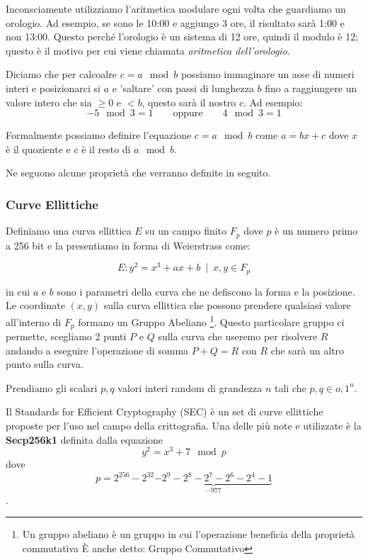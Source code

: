 \documentclass[12pt,a4paper]{article}
\begin{document}
Inconsciamente utilizziamo l'aritmetica modulare ogni volta che guardiamo un
orologio. Ad esempio, se sono le 10:00 e aggiungo 3 ore, il risultato sarà 1:00
e non 13:00. Questo perché l'orologio è un sistema di 12 ore, quindi il modulo è
12; questo è il motivo per cui viene chiamata \textit{aritmetica dell'orologio}.

Diciamo che per calcoalre $ c = a \mod{b} $ possiamo immaginare un asse di
numeri interi e posizionarci si $ a $ e 'saltare' con passi di lunghezza $ b $
fino a raggiungere un valore intero che sia $ \ge 0 $ e $ < b $, questo sarà il
nostro $ c $. Ad esempio:
$$ -5 \mod{3} = 1 \qquad \text{oppure} \qquad 4 \mod 3 = 1 $$

Formalmente possiamo definire l'equazione $ c = a \mod{b} $ come $ a = bx + c $
dove $ x $ è il quoziente e $ c $ è il resto di $ a \mod b $.

Ne seguono alcune proprietà che verranno definite in seguito.

\subsubsection{Curve Ellittiche}
Definiamo una curva ellittica $ E $ su un campo finito $ F_p $ dove $ p $ è un
numero primo a 256 bit e la presentiamo in forma di Weierstrass come:

$$ E: y^2 = x^3 + ax + b \enspace | \enspace x, y \in F_p $$

in cui $ a $ e $ b $ sono i parametri della curva che ne defiscono la forma e la
posizione. Le coordinate $ (x,y) $ sulla curva ellittica che possono prendere
qualsiasi valore all'interno di $F_p$ formano un Gruppo Abeliano \footnote{Un
gruppo abeliano è un gruppo in cui l'operazione beneficia della proprietà
commutativa È anche detto: Gruppo Commutativo}. Questo particolare gruppo ci
permette, scegliamo 2 punti $ P $ e $ Q $ sulla curva che useremo per risolvere
$ R $ andando a eseguire l'operazione di somma $ P + Q = R $ con $ R $ che sarà
un altro punto sulla curva.

Prendiamo gli scalari $p, q$ valori interi random di grandezza $n$ tali che $ p,
q \in {o,1}^n $.

Il Standards for Efficient Cryptography (SEC) è un set di curve ellittiche
proposte per l'uso nel campo della crittografia. Una delle più note e utilizzate
è la \textbf{Secp256k1} definita dalla equazione
$$ y^2 = x^3 + 7 \mod{p} $$ dove 
$$ p = 2^{256} - 2^{32} \underbrace{- 2^9 - 2^8 - 2^7 - 2^6 - 2^4 - 1}_{-977}
$$.
\end{document}
